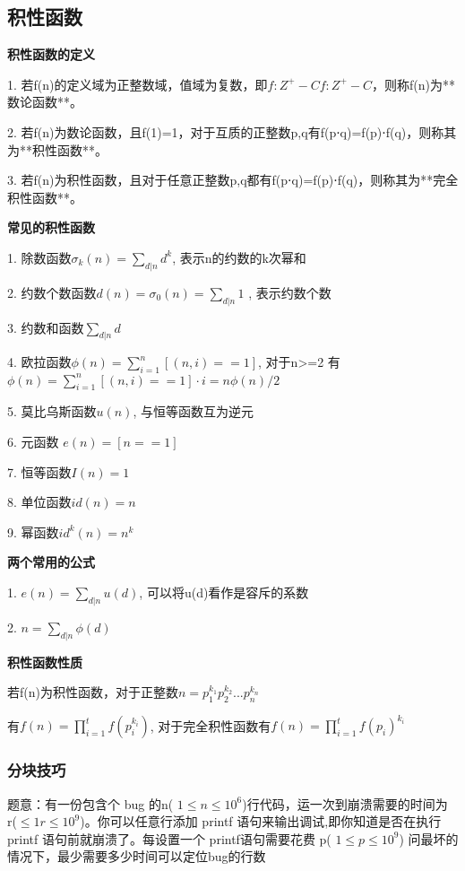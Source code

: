 \subsection{积性函数}

{\bfseries 积性函数的定义}

1. 若f(n)的定义域为正整数域，值域为复数，即$f:Z^+ - Cf:Z^+ - C$，则称f(n)为**数论函数**。 

2. 若f(n)为数论函数，且f(1)=1，对于互质的正整数p,q有f(p⋅q)=f(p)⋅f(q)，则称其为**积性函数**。
 
3. 若f(n)为积性函数，且对于任意正整数p,q都有f(p⋅q)=f(p)⋅f(q)，则称其为**完全积性函数**。

{\bfseries  常见的积性函数}

1. 除数函数$\sigma_k(n) = \sum_{d|n} d^k$, 表示n的约数的k次幂和

2. 约数个数函数$d(n) = \sigma_0(n) = \sum_{d|n} 1$ , 表示约数个数

3. 约数和函数$\sum_{d|n} d$

4. 欧拉函数$\phi(n)=\sum_{i=1}^{n} [(n, i) == 1]$, 对于n>=2 有 $\phi(n)=\sum_{i=1}^{n} [(n, i) == 1] · i = n\phi(n)/2 $

5. 莫比乌斯函数$u(n)$, 与恒等函数互为逆元

6. 元函数 $e(n) = [n == 1]$

7. 恒等函数$I(n) = 1$

8. 单位函数$id(n) =n$

9. 幂函数$id^k(n) = n^k$

{\bfseries 两个常用的公式}

1. $e(n) = \sum_{d|n}u(d)$, 可以将u(d)看作是容斥的系数

2. $n = \sum_{d|n} \phi(d)$

{\bfseries 积性函数性质}

若f(n)为积性函数，对于正整数$n = p_{1}^{k_1}p_{2}^{k_2}...p_{n}^{k_n}$

有$f(n)=\prod_{i=1}^{t}{f(p_i^{k_i})}  $, 对于完全积性函数有$f(n)=\prod_{i=1}^{t}{f(p_i)^{k_i}}$


\subsubsection{分块技巧}

题意：有一份包含个 bug 的n( $1 \le n \le 10^6 $)行代码，运一次到崩溃需要的时间为 r($ \le 1 r \le 10^9 $)。你可以任意行添加 printf 语句来输出调试,即你知道是否在执行 printf 语句前就崩溃了。每设置一个 printf语句需要花费 p( $1 \le p \le 10^9$)
问最坏的情况下，最少需要多少时间可以定位bug的行数

